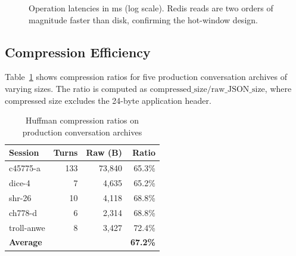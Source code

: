 \documentclass[conference]{IEEEtran}
\begin{document}
\begin{figure}[h]
\centering
{}
\caption{Operation latencies in ms (log scale). Redis reads are two orders of magnitude faster than disk, confirming the hot-window design.}
\label{fig:latency}
\end{figure}

\subsection{Compression Efficiency}

Table~\ref{tab:compression} shows compression ratios for five production conversation archives of varying sizes. The ratio is computed as $\text{compressed\_size} / \text{raw\_JSON\_size}$, where compressed size excludes the 24-byte application header.

\begin{table}[h]
\centering
\caption{Huffman compression ratios on production conversation archives}
\label{tab:compression}
\begin{tabular}{lrrr}
\toprule
\textbf{Session} & \textbf{Turns} & \textbf{Raw (B)} & \textbf{Ratio} \\
\midrule
c45775-a & 133 & 73{,}840 & 65.3\% \\
dice-4 & 7 & 4{,}635 & 65.2\% \\
shr-26 & 10 & 4{,}118 & 68.8\% \\
ch778-d & 6 & 2{,}314 & 68.8\% \\
troll-anwe & 8 & 3{,}427 & 72.4\% \\
\midrule
\textbf{Average} & & & \textbf{67.2\%} \\
\bottomrule
\end{tabular}
\end{table}
\end{document}
